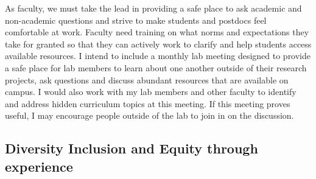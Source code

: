 \documentclass[11pt]{article}
\begin{document}
As faculty, we must take the lead in providing a safe place to ask academic and non-academic questions and strive to make students and postdocs feel comfortable at work. Faculty need training on what norms and expectations they take for granted so that they can actively work to clarify and help students access available resources. I intend to include a monthly lab meeting designed to provide a safe place for lab members to learn about one another outside of their research projects, ask questions and discuss abundant resources that are available on campus. I would also work with my lab members and other faculty to identify and address hidden curriculum topics at this meeting. If this meeting proves useful, I may encourage people outside of the lab to join in on the discussion. %















\subsection*{Diversity Inclusion and Equity through experience}

\end{document}
